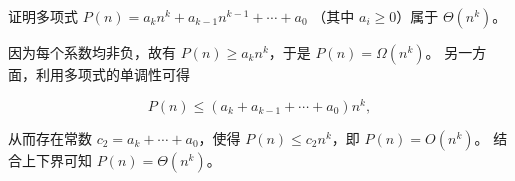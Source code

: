 \documentclass{homework}
\begin{document}
\pagebreak

\begin{homeworkProblem}
    证明多项式
    \(P(n) = a_kn^k + a_{k-1}n^{k-1} + \cdots + a_0\)
    （其中 \(a_i \geq 0\)）属于 \(\Theta(n^k)\)。

    \solution

    因为每个系数均非负，故有
    \(P(n) \geq a_kn^k\)，于是 \(P(n) = \Omega(n^k)\)。
    另一方面，利用多项式的单调性可得

    \[
        P(n)
        \leq (a_k + a_{k-1} + \cdots + a_0) n^k,
    \]

    从而存在常数 \(c_2 = a_k + \cdots + a_0\)，使得
    \(P(n) \leq c_2 n^k\)，即 \(P(n) = O(n^k)\)。
    结合上下界可知 \(P(n) = \Theta(n^k)\)。
\end{homeworkProblem}
\end{document}

